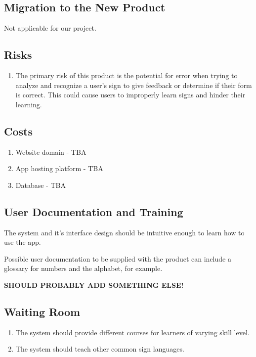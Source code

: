 \documentclass[12pt, titlepage]{article}
\begin{document}
\subsection{Migration to the New Product}
Not applicable for our project.

\subsection{Risks}

\begin{enumerate}
    \item The primary risk of this product is the potential for error when trying to analyze and recognize a user's sign to give feedback or determine if their form is correct. This could cause users to improperly learn signs and hinder their learning.
\end{enumerate}

\subsection{Costs}
\begin{enumerate}
    \item Website domain - TBA
    \item App hosting platform - TBA
    \item Database - TBA
\end{enumerate}

\subsection{User Documentation and Training}
The system and it's interface design should be intuitive enough to learn how to use the app.

Possible user documentation to be supplied with the product can include a glossary for numbers and the alphabet, for example. 

\bf{SHOULD PROBABLY ADD SOMETHING ELSE!}

\subsection{Waiting Room}
\begin{enumerate}
    \item The system should provide different courses for learners of varying skill level.
    \item The system should teach other common sign languages.
\end{enumerate}
\end{document}
